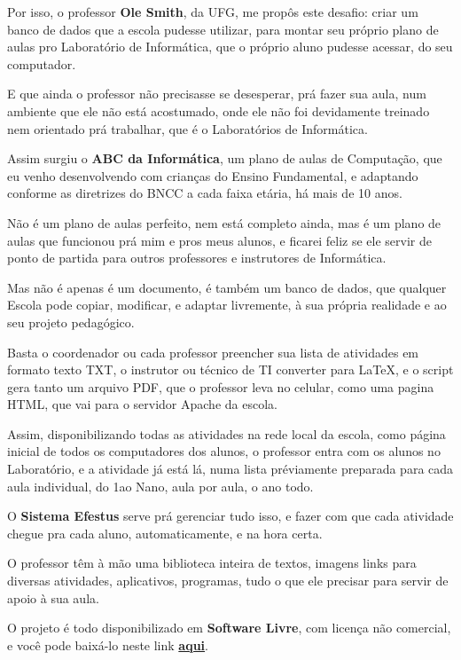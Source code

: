 \begin{multicols}{2}
Por isso, o professor \textbf{Ole Smith}, da UFG, me propôs este desafio: criar um banco de dados que a escola pudesse utilizar, para montar seu próprio plano de aulas pro Laboratório de Informática, que o próprio aluno pudesse acessar, do seu computador.

E que ainda o professor não precisasse se desesperar, prá fazer sua aula, num ambiente que ele não está acostumado, onde ele não foi devidamente treinado nem orientado prá trabalhar, que é o Laboratórios de Informática.

Assim surgiu o \textbf{ABC da Informática}, um plano de aulas de Computação, que eu venho desenvolvendo com crianças do Ensino Fundamental, e adaptando conforme as diretrizes do BNCC a cada faixa etária, há mais de 10 anos.

Não é um plano de aulas perfeito, nem está completo ainda, mas é um plano de aulas que funcionou prá mim e pros meus alunos, e ficarei feliz se ele servir de ponto de partida para outros professores e instrutores de Informática.

Mas não é apenas é um documento, é também um banco de dados, que qualquer Escola pode copiar, modificar, e adaptar livremente, à sua própria realidade e ao seu projeto pedagógico.

Basta o coordenador ou cada professor preencher sua lista de atividades em formato texto TXT, o instrutor ou técnico de TI converter para \LaTeX, e o script gera tanto um arquivo PDF, que o professor leva no celular, como uma pagina HTML, que vai para o servidor Apache da escola.

Assim, disponibilizando todas as atividades na rede local da escola, como página inicial de todos os computadores dos alunos, o professor entra com os alunos no Laboratório, e a atividade já está lá, numa lista préviamente preparada para cada aula individual, do 1\textordmasculine ao N\textordmasculine ano, aula por aula, o ano todo.

O \textbf{Sistema Efestus} serve prá gerenciar tudo isso, e fazer com que cada atividade chegue pra cada aluno, automaticamente, e na hora certa.

O professor têm à mão uma biblioteca inteira de textos, imagens links para diversas atividades, aplicativos, programas, tudo o que ele precisar para servir de apoio à sua aula.

O projeto é todo disponibilizado em \textbf{Software Livre}, com licença não comercial, e você pode baixá-lo neste link \href{https://github.com/aravecchia/HEFESTUS/blob/main/HEFESTUS.pdf}{\textbf{\Large aqui}}.


\end{multicols}
